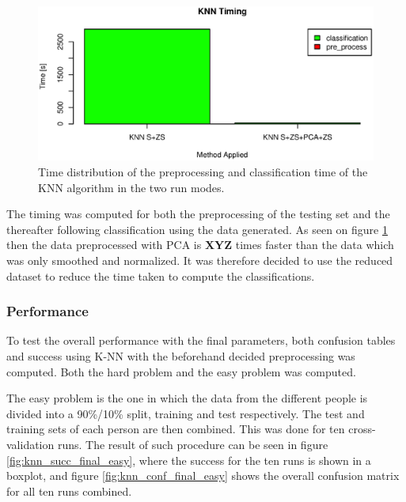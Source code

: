 \begin{figure}[H]
\centering
\includegraphics[width =  \textwidth]{graphics/compare_timing_knn_smoothVSpca}
\caption[Time distribution for K-NN.]{Time distribution of the preprocessing and classification time of the KNN algorithm in the two run modes.}
\label{fig:knn_timing_comp}
\end{figure}

The timing was computed for both the preprocessing of the testing set and the thereafter following classification using the data generated.
As seen on figure \ref{fig:knn_timing_comp} then the data preprocessed with PCA is \textbf{XYZ} times faster than the data which was only smoothed and normalized.
It was therefore decided to use the reduced dataset to reduce the time taken to compute the classifications.


\subsubsection{Performance}

To test the overall performance with the final parameters, both confusion tables and success using K-NN with the beforehand decided preprocessing was computed.
Both the hard problem and the easy problem was computed.

The easy problem is the one in which the data from the different people is divided into a 90\%/10\% split, training and test respectively.
The test and training sets of each person are then combined.
This was done for ten cross-validation runs.
The result of such procedure can be seen in figure \ref{fig:knn_succ_final_easy}, where the success for the ten runs is shown in a boxplot, and figure \ref{fig:knn_conf_final_easy} shows the overall confusion matrix for all ten runs combined.


